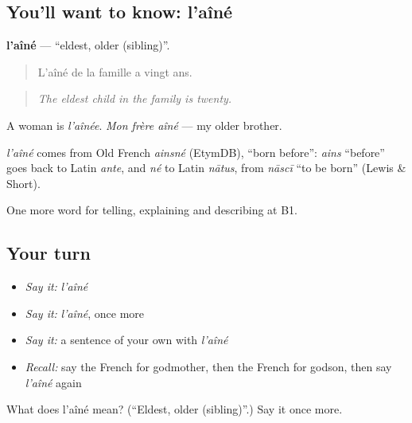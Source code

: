 \subsection*{You'll want to know: l'aîné}
\textbf{l'aîné} — \textquotedblleft{}eldest, older (sibling)\textquotedblright{}.

\begin{quote}
L'aîné de la famille a vingt ans.
\end{quote}

\begin{quote}
\emph{The eldest child in the family is twenty.}
\end{quote}

A woman is \emph{l'aînée}. \emph{Mon frère aîné} — my older brother.

\begin{cousinweb}
\emph{l'aîné} comes from Old French \emph{ainsné} (EtymDB), \textquotedblleft{}born before\textquotedblright{}: \emph{ains} \textquotedblleft{}before\textquotedblright{} goes back to Latin \emph{ante}, and \emph{né} to Latin \emph{nātus}, from \emph{nāscī} \textquotedblleft{}to be born\textquotedblright{} (Lewis \& Short).
\end{cousinweb}

\begin{grammarlens}[title={What you've built}]
One more word for telling, explaining and describing at B1.
\end{grammarlens}

\subsection*{Your turn}
\begin{itemize}
\raggedright
  \item \emph{Say it:} \emph{l'aîné}
  \item \emph{Say it:} \emph{l'aîné}, once more
  \item \emph{Say it:} a sentence of your own with \emph{l'aîné}
  \item \emph{Recall:} say the French for godmother, then the French for godson, then say \emph{l'aîné} again
\end{itemize}

\begin{tcolorbox}[breakable,colback=teal!4,colframe=teal!35!black,title={Before you move on}]
What does l'aîné mean? (\textquotedblleft{}Eldest, older (sibling)\textquotedblright{}.) Say it once more.
\end{tcolorbox}
